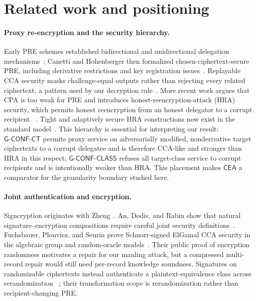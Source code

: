 \documentclass[11pt,letterpaper]{article}
\theoremstyle{definition}
\theoremstyle{remark}
\newcommand{\CEA}{\ensuremath{\mathsf{CEA}}\xspace}
\newcommand{\GClass}{\ensuremath{\mathsf{G\text{-}CONF\text{-}CLASS}}\xspace}
\newcommand{\GCT}{\ensuremath{\mathsf{G\text{-}CONF\text{-}CT}}\xspace}
\begin{document}
\section{Related work and positioning}
\label{sec:related}

\paragraph{Proxy re-encryption and the security hierarchy.}
Early PRE schemes established bidirectional and unidirectional delegation
mechanisms~\cite{BBS98,AFGH06}; Canetti and Hohenberger then formalized
chosen-ciphertext-secure PRE, including derivative restrictions and key
registration issues~\cite{CH07}.  Replayable CCA security masks challenge-equal
outputs rather than rejecting every related ciphertext, a pattern used by our
decryption rule~\cite{CKN03}.  More recent work argues that CPA is too weak for
PRE and introduces honest-reencryption-attack (HRA) security, which permits
honest reencryption from an honest delegator to a corrupt recipient
~\cite{Cohen19}.  Tight and adaptively secure HRA constructions now exist in the
standard model~\cite{CohenEtAl25,LingEtAl25}.  This hierarchy is essential for
interpreting our result: \GCT permits proxy service on adversarially modified,
nonderivative target ciphertexts to a corrupt delegatee and is therefore
CCA-like and stronger than HRA in this respect; \GClass refuses all target-class
service to corrupt recipients and is intentionally weaker than HRA.  This
placement makes \CEA a comparator for the granularity boundary studied here.

\paragraph{Joint authentication and encryption.}
Signcryption originates with Zheng~\cite{Zheng97}.  An, Dodis, and Rabin show
that natural signature--encryption compositions require careful joint security
definitions~\cite{ADR02}.  Fuchsbauer, Plouviez, and Seurin prove
Schnorr-signed ElGamal CCA security in the algebraic group and random-oracle
models~\cite{FPS20}.  Their public proof of encryption randomness motivates a
repair for our mauling attack, but a compressed multi-record repair would still
need per-record knowledge soundness.  Signatures on randomizable ciphertexts
instead authenticate a plaintext-equivalence class across rerandomization
~\cite{BF20}; their transformation scope is rerandomization rather than
recipient-changing PRE.
\end{document}
